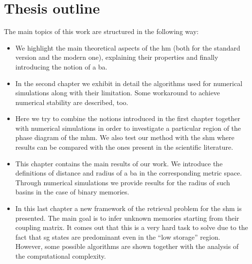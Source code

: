 \documentclass[\rootdir/main.tex]{subfiles}
\begin{document}
\section*{Thesis outline}
The main topics of this work are structured in the following way:
\begin{itemize}
    \item[\Cref{chap:hopfield}] We highlight the main theoretical aspects of the \acrlong{hm} (both for the standard version and the modern one), explaining their properties and finally introducing the notion of a \acrlong{ba}.
    
    \item[\Cref{chap:numerical_sim}] In the second chapter we exhibit in detail the algorithms used for numerical simulations along with their limitation. Some workaround to achieve numerical stability are described, too.
    
    \item[\Cref{chap:phase_diagram}] Here we try to combine the notions introduced in the first chapter together with numerical simulations in order to investigate a particular region of the phase diagram of the \acrlong{mhm}. We also test our method with the \acrlong{shm} where results can be compared with the ones present in the scientific literature.
    
    \item[\Cref{chap:radius}] This chapter contains the main results of our work. We introduce the definitions of distance and radius of a \acrlong{ba} in the corresponding metric space. Through numerical simulations we provide results for the radius of such basins in the case of binary memories.
    
    \item[\Cref{chap:fact}] In this last chapter a new framework of the retrieval problem for the \acrlong{shm} is presented. The main goal is to infer unknown memories starting from their coupling matrix. It comes out that this is a very hard task to solve due to the fact that \acrlong{sg} states are predominant even in the ``low storage'' region. However, some possible algorithms are shown together with the analysis of the computational complexity.
\end{itemize}

\subbibliography %
\end{document}
